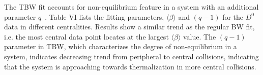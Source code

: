 \documentclass[%
 reprint,	
 amsmath,amssymb,
 aps,
 prc,
]{revtex4-1}
\begin{document}
The TBW fit accounts for non-equilibrium feature in a system with an additional parameter $q$~\cite{Tang:2008ud}. %
Table VI lists the fitting parameters, $\langle\beta\rangle$ and $(q-1)$ for the $D^0$ data in different centralities. Results show a similar trend as the regular BW fit, i.e. the most central data point locates at the largest $\langle\beta\rangle$ value. The $(q-1)$ parameter in TBW, which characterizes the degree of non-equilibrium in a system, indicates decreasing trend from peripheral to central collisions, indicating that the system is approaching towards thermalization in more central collisions.
\end{document}
